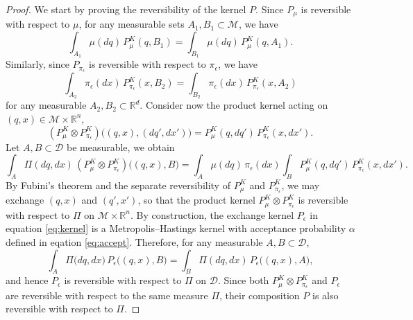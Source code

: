 \documentclass[12pt]{article}
\begin{document}
\begin{proof}
We start by proving the reversibility of the kernel $P$.
Since $P_\mu$ is reversible with respect to $\mu$, for any measurable sets
$A_1,B_1 \subset \mathcal M$, we have
\[
\int_{A_1} \mu(dq)\, P^K_\mu(q,B_1)
=
\int_{B_1} \mu(dq)\, P^K_\mu(q,A_1).
\]
Similarly, since $P_{\pi_\epsilon}$ is reversible with respect to $\pi_\epsilon$, we have
\[
\int_{A_2} \pi_\epsilon(dx)\, P_{\pi_\epsilon}^K(x,B_2)
=
\int_{B_2} \pi_\epsilon(dx)\, P_{\pi_\epsilon}^K(x,A_2)
\]
for any measurable $A_2,B_2 \subset \mathbb R^d$.
Consider now the product kernel acting on $(q,x)\in\mathcal{M}\times \mathbb R^n$,
\[
\left(
P_\mu^K \otimes P_{\pi_\epsilon}^K
\right)
\big((q,x), (dq',dx')\big)
=
P_\mu^K(q,dq')\,
P_{\pi_\epsilon}^K(x,dx').
\]
Let $A,B \subset \mathcal D$ be measurable,
we obtain
\[
\int_A \Pi(dq,dx)\,
\left(
P_\mu^K \otimes P_{\pi_\epsilon}^K
\right)
\big((q,x),B\big)
=
\int_A
\mu(dq)\,\pi_\epsilon(dx)
\int_B
P_\mu^K(q,dq')\,
P_{\pi_\epsilon}^K(x,dx').
\]
By Fubini's theorem and the separate reversibility of
$P_\mu^K$ and $P_{\pi_\epsilon}^K$, we may exchange
$(q,x)$ and $(q',x')$, so that the product kernel
$P_\mu^K \otimes P_{\pi_\epsilon}^K$
is reversible with respect to $\Pi$ on $\mathcal{M}\times \mathbb R^n$.
By construction, the exchange kernel $P_\epsilon$ in equation \eqref{eq:kernel}
is a Metropolis--Hastings kernel with acceptance probability
$\alpha$ defined in eqation \eqref{eq:accept}. 
Therefore, for any measurable $A,B\subset\mathcal D$,
\[
\int_A \Pi\big(dq,dx\big)\,P_\epsilon\big ((q,x),B)
=
\int_B \Pi(dq,dx)\,P_\epsilon\big((q,x),A\big),
\]
and hence $P_\epsilon$ is reversible with respect to $\Pi$ on $\mathcal{D}$.
Since both
\(
P_\mu^K \otimes P_{\pi_\epsilon}^K\) and 
\(P_\epsilon
\)
are reversible with respect to the same measure $\Pi$,
their composition $P$
is also reversible with respect to $\Pi$.


\end{proof}
\end{document}

